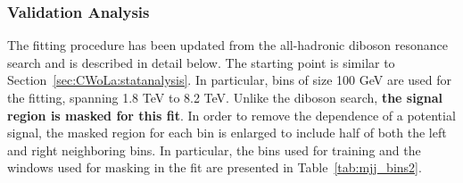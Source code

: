 

\subsubsection{Validation Analysis}
The fitting procedure has been updated from the all-hadronic diboson resonance search and is described in detail below.   The starting point is similar to Section~\ref{sec:CWoLa:statanalysis}.  In particular, bins of size 100 GeV are used for the fitting, spanning 1.8 TeV to 8.2 TeV.  Unlike the diboson search, \textbf{the signal region is masked for this fit}.  In order to remove the dependence of a potential signal, the masked region for each bin is enlarged to include half of both the left and right neighboring bins.  In particular, the bins used for training and the windows used for masking in the fit are presented in Table~\ref{tab:mjj_bins2}.

